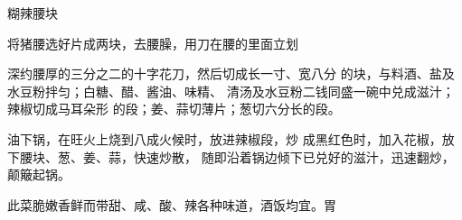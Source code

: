 \begin{recipe}[宫保腰块]{糊辣腰块}

\ingredients


\cooking

\step 将猪腰选好片成两块，去腰臊，用刀在腰的里面立划

深约腰厚的三分之二的十字花刀，然后切成长一寸、宽八分 的块，与料酒、盐及水豆粉拌匀；白糖、醋、酱油、味精、 清汤及水豆粉二钱同盛一碗中兑成滋汁；辣椒切成马耳朵形 的段；姜、蒜切薄片；葱切六分长的段。

\step 油下锅，在旺火上烧到八成火候时，放进辣椒段，炒 成黑红色时，加入花椒，放下腰块、葱、姜、蒜，快速炒散， 随即沿着锅边倾下已兑好的滋汁，迅速翻炒，颠簸起锅。

\notes

此菜脆嫩香鲜而带甜、咸、酸、辣各种味道，酒饭均宜。胃

\end{recipe}

